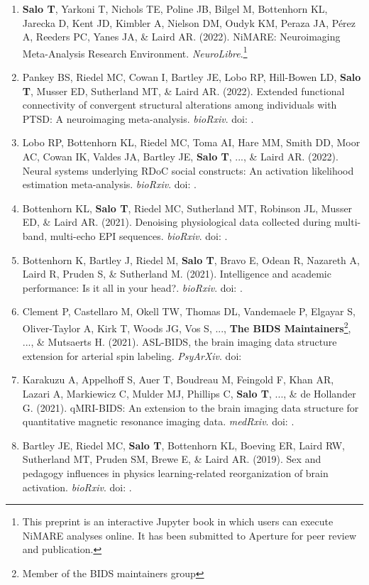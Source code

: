 \documentclass[10pt]{article}
\newcommand{\doi}[1]{doi: \textlink{https://doi.org/#1}{#1}}
\newcommand{\textlink}[3][blue]{\href{#2}{\color{#1}{#3}}}
\begin{document}
\begin{enumerate}

	\item \textbf{Salo T}, Yarkoni T, Nichols TE, Poline JB, Bilgel M, Bottenhorn KL, Jarecka D, Kent JD, Kimbler A, Nielson DM, Oudyk KM, Peraza JA, Pérez A, Reeders PC, Yanes JA, \& Laird AR.
	(2022).
	NiMARE: Neuroimaging Meta-Analysis Research Environment.
	\emph{NeuroLibre}.\footnote{This preprint is an interactive Jupyter book in which users can execute NiMARE analyses online. It has been submitted to Aperture for peer review and publication.}

	\item Pankey BS, Riedel MC, Cowan I, Bartley JE, Lobo RP, Hill-Bowen LD, \textbf{Salo T}, Musser ED, Sutherland MT, \& Laird AR.
	(2022).
	Extended functional connectivity of convergent structural alterations among individuals with PTSD: A neuroimaging meta-analysis.
	\emph{bioRxiv}.
	\doi{10.1101/2022.04.07.487478}.

	\item Lobo RP, Bottenhorn KL, Riedel MC, Toma AI, Hare MM, Smith DD, Moor AC, Cowan IK, Valdes JA, Bartley JE, \textbf{Salo T}, ..., \& Laird AR.
	(2022).
	Neural systems underlying RDoC social constructs: An activation likelihood estimation meta-analysis.
	\emph{bioRxiv}.
	\doi{10.1101/2022.04.04.487016}.

	\item Bottenhorn KL, \textbf{Salo T}, Riedel MC, Sutherland MT, Robinson JL, Musser ED, \& Laird AR.
	(2021).
	Denoising physiological data collected during multi-band, multi-echo EPI sequences.
	\emph{bioRxiv}.
	\doi{10.1101/2021.04.01.437293}.

	\item Bottenhorn K, Bartley J, Riedel M, \textbf{Salo T}, Bravo E, Odean R, Nazareth A, Laird R, Pruden S, \& Sutherland M.
	(2021).
	Intelligence and academic performance: Is it all in your head?.
	\emph{bioRxiv}.
	\doi{10.1101/2021.01.23.427928}.

	\item Clement P, Castellaro M, Okell TW, Thomas DL, Vandemaele P, Elgayar S, Oliver-Taylor A, Kirk T, Woods JG, Vos S, ..., \textbf{The BIDS Maintainers}\footnote{Member of the BIDS maintainers group}, ..., \& Mutsaerts H.
	(2021).
	ASL-BIDS, the brain imaging data structure extension for arterial spin labeling.
	\emph{PsyArXiv}.
	\doi{10.31234/osf.io/e87y3}

	\item Karakuzu A, Appelhoff S, Auer T, Boudreau M, Feingold F, Khan AR, Lazari A, Markiewicz C, Mulder MJ, Phillips C, \textbf{Salo T}, ..., \& de Hollander G.
	(2021).
	qMRI-BIDS: An extension to the brain imaging data structure for quantitative magnetic resonance imaging data.
	\emph{medRxiv}.
	\doi{10.1101/2021.10.22.21265382}.

	\item Bartley JE, Riedel MC, \textbf{Salo T}, Bottenhorn KL, Boeving ER, Laird RW, Sutherland MT, Pruden SM, Brewe E, \& Laird AR.
	(2019).
	Sex and pedagogy influences in physics learning-related reorganization of brain activation.
	\emph{bioRxiv}.
	\doi{10.1101/791301}.

\end{enumerate}
\end{document}
